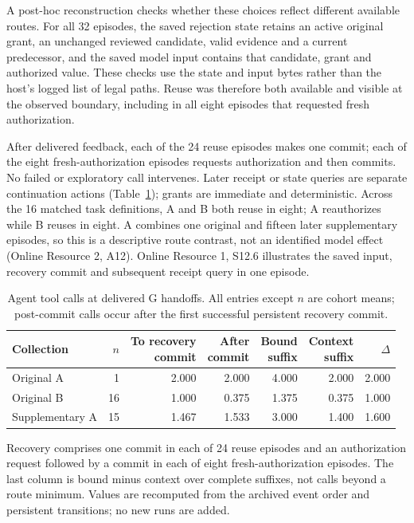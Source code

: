 \documentclass[pdflatex,sn-basic]{sn-jnl}
\begin{document}
A post-hoc reconstruction checks whether these choices reflect different available routes. For all 32 episodes, the saved rejection state retains an active original grant, an unchanged reviewed candidate, valid evidence and a current predecessor, and the saved model input contains that candidate, grant and authorized value. These checks use the state and input bytes rather than the host's logged list of legal paths. Reuse was therefore both available and visible at the observed boundary, including in all eight episodes that requested fresh authorization.

After delivered feedback, each of the 24 reuse episodes makes one commit; each of the eight fresh-authorization episodes requests authorization and then commits. No failed or exploratory call intervenes. Later receipt or state queries are separate continuation actions (Table~\ref{tab:recovery-decomposition}); grants are immediate and deterministic. Across the 16 matched task definitions, A and B both reuse in eight; A reauthorizes while B reuses in eight. A combines one original and fifteen later supplementary episodes, so this is a descriptive route contrast, not an identified model effect (Online Resource 2, A12). Online Resource 1, S12.6 illustrates the saved input, recovery commit and subsequent receipt query in one episode.

\begin{table}[tbp]
\caption{Agent tool calls at delivered G handoffs. All entries except $n$ are cohort means; post-commit calls occur after the first successful persistent recovery commit.}\label{tab:recovery-decomposition}
\centering\small
\setlength{\tabcolsep}{3pt}
\begin{tabular*}{\textwidth}{@{\extracolsep{\fill}}lrrrrrr@{}}
\toprule
Collection & $n$ & \shortstack{To recovery\\commit} & \shortstack{After\\commit} & \shortstack{Bound\\suffix} & \shortstack{Context\\suffix} & $\Delta$ \\
\midrule
Original A & 1 & 2.000 & 2.000 & 4.000 & 2.000 & 2.000 \\
Original B & 16 & 1.000 & 0.375 & 1.375 & 0.375 & 1.000 \\
Supplementary A & 15 & 1.467 & 1.533 & 3.000 & 1.400 & 1.600 \\
\bottomrule
\end{tabular*}
\par\smallskip\begin{minipage}{\textwidth}\small Recovery comprises one commit in each of 24 reuse episodes and an authorization request followed by a commit in each of eight fresh-authorization episodes. The last column is bound minus context over complete suffixes, not calls beyond a route minimum. Values are recomputed from the archived event order and persistent transitions; no new runs are added.\end{minipage}
\end{table}
\end{document}
